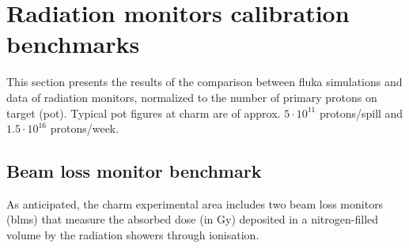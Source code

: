 \documentclass[encoding=utf8,british]{tumphthesis}
\begin{document}
\section{Radiation monitors calibration benchmarks}
\label{section:radiation-monitors-calibration-benchmarks}
This section presents the results of the comparison between \acrshort{fluka} simulations and data of radiation monitors, normalized to the number of primary protons on target (\acrshort{pot}). Typical \acrshort{pot} figures at \acrshort{charm} are of approx. $5 \cdot 10^{11}$ protons/spill and $1.5 \cdot 10^{16}$ protons/week.

\subsection{Beam loss monitor benchmark}
\label{subsection:charm-blm-benchmark}


As anticipated, the \acrshort{charm} experimental area includes two beam loss monitors (\acrshort{blm}s) that measure the absorbed dose (in Gy) deposited in a nitrogen-filled volume by the radiation showers through ionisation. 
\end{document}
